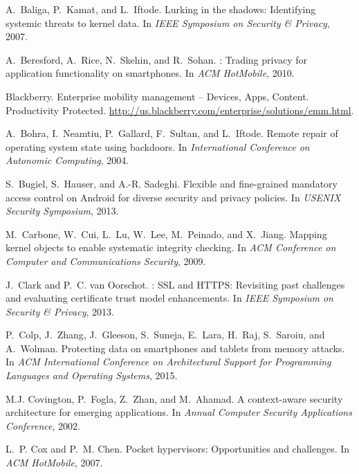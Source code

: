 \documentclass[pageno]{sig-alternate-05-2015}
\begin{document}
\begin{thebibliography}{10}
A.~Baliga, P.~Kamat, and L.~Iftode.
\newblock Lurking in the shadows: {Identifying} systemic threats to kernel
  data.
\newblock In {\em IEEE Symposium on Security \& Privacy}, 2007.

A.~Beresford, A.~Rice, N.~Skehin, and R.~Sohan.
: {Trading} privacy for application functionality on
  smartphones.
\newblock In {\em ACM HotMobile}, 2010.

Blackberry.
\newblock Enterprise mobility management -- {Devices, Apps, Content.
  Productivity Protected}.
\newblock \url{http://us.blackberry.com/enterprise/solutions/emm.html}.

A.~Bohra, I.~Neamtiu, P.~Gallard, F.~Sultan, and L.~Iftode.
\newblock Remote repair of operating system state using backdoors.
\newblock In {\em International Conference on Autonomic Computing}, 2004.

S.~Bugiel, S.~Hauser, and A.-R. Sadeghi.
\newblock Flexible and fine-grained mandatory access control on {Android} for
  diverse security and privacy policies.
\newblock In {\em USENIX Security Symposium}, 2013.

M.~Carbone, W.~Cui, L.~Lu, W.~Lee, M.~Peinado, and X.~Jiang.
\newblock Mapping kernel objects to enable systematic integrity checking.
\newblock In {\em ACM Conference on Computer and Communications Security},
  2009.

J.~Clark and P.~C. van Oorschot.
: {SSL} and {HTTPS}: Revisiting past challenges and evaluating
  certificate trust model enhancements.
\newblock In {\em IEEE Symposium on Security \& Privacy}, 2013.

P.~Colp, J.~Zhang, J.~Gleeson, S.~Suneja, E.~Lara, H.~Raj, S.~Saroiu, and
  A.~Wolman.
\newblock Protecting data on smartphones and tablets from memory attacks.
\newblock In {\em ACM International Conference on Architectural Support for
  Programming Languages and Operating Systems}, 2015.

M.J. Covington, P.~Fogla, Z.~Zhan, and M.~Ahamad.
\newblock A context-aware security architecture for emerging applications.
\newblock In {\em Annual Computer Security Applications Conference}, 2002.

L.~P. Cox and P.~M. Chen.
\newblock Pocket hypervisors: Opportunities and challenges.
\newblock In {\em ACM HotMobile}, 2007.


\end{thebibliography}
\end{document}
